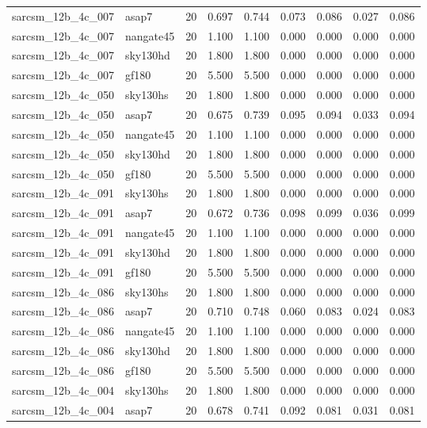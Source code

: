 \begin{tabular}{llrrrrrrr}
sarcsm\_12b\_4c\_007 & asap7 & 20 & 0.697 & 0.744 & 0.073 & 0.086 & 0.027 & 0.086 \\
sarcsm\_12b\_4c\_007 & nangate45 & 20 & 1.100 & 1.100 & 0.000 & 0.000 & 0.000 & 0.000 \\
sarcsm\_12b\_4c\_007 & sky130hd & 20 & 1.800 & 1.800 & 0.000 & 0.000 & 0.000 & 0.000 \\
sarcsm\_12b\_4c\_007 & gf180 & 20 & 5.500 & 5.500 & 0.000 & 0.000 & 0.000 & 0.000 \\
sarcsm\_12b\_4c\_050 & sky130hs & 20 & 1.800 & 1.800 & 0.000 & 0.000 & 0.000 & 0.000 \\
sarcsm\_12b\_4c\_050 & asap7 & 20 & 0.675 & 0.739 & 0.095 & 0.094 & 0.033 & 0.094 \\
sarcsm\_12b\_4c\_050 & nangate45 & 20 & 1.100 & 1.100 & 0.000 & 0.000 & 0.000 & 0.000 \\
sarcsm\_12b\_4c\_050 & sky130hd & 20 & 1.800 & 1.800 & 0.000 & 0.000 & 0.000 & 0.000 \\
sarcsm\_12b\_4c\_050 & gf180 & 20 & 5.500 & 5.500 & 0.000 & 0.000 & 0.000 & 0.000 \\
sarcsm\_12b\_4c\_091 & sky130hs & 20 & 1.800 & 1.800 & 0.000 & 0.000 & 0.000 & 0.000 \\
sarcsm\_12b\_4c\_091 & asap7 & 20 & 0.672 & 0.736 & 0.098 & 0.099 & 0.036 & 0.099 \\
sarcsm\_12b\_4c\_091 & nangate45 & 20 & 1.100 & 1.100 & 0.000 & 0.000 & 0.000 & 0.000 \\
sarcsm\_12b\_4c\_091 & sky130hd & 20 & 1.800 & 1.800 & 0.000 & 0.000 & 0.000 & 0.000 \\
sarcsm\_12b\_4c\_091 & gf180 & 20 & 5.500 & 5.500 & 0.000 & 0.000 & 0.000 & 0.000 \\
sarcsm\_12b\_4c\_086 & sky130hs & 20 & 1.800 & 1.800 & 0.000 & 0.000 & 0.000 & 0.000 \\
sarcsm\_12b\_4c\_086 & asap7 & 20 & 0.710 & 0.748 & 0.060 & 0.083 & 0.024 & 0.083 \\
sarcsm\_12b\_4c\_086 & nangate45 & 20 & 1.100 & 1.100 & 0.000 & 0.000 & 0.000 & 0.000 \\
sarcsm\_12b\_4c\_086 & sky130hd & 20 & 1.800 & 1.800 & 0.000 & 0.000 & 0.000 & 0.000 \\
sarcsm\_12b\_4c\_086 & gf180 & 20 & 5.500 & 5.500 & 0.000 & 0.000 & 0.000 & 0.000 \\
sarcsm\_12b\_4c\_004 & sky130hs & 20 & 1.800 & 1.800 & 0.000 & 0.000 & 0.000 & 0.000 \\
sarcsm\_12b\_4c\_004 & asap7 & 20 & 0.678 & 0.741 & 0.092 & 0.081 & 0.031 & 0.081 \\

\end{tabular}
